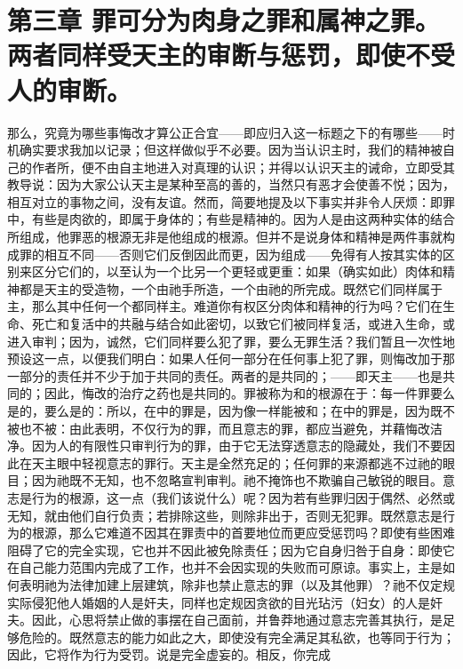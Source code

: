 
\section{第三章 罪可分为肉身之罪和属神之罪。两者同样受天主的审断与惩罚，即使不受人的审断。}

那么，究竟为哪些事悔改才算公正合宜——即应归入这一标题之下的有哪些——时机确实要求我加以记录；但这样做似乎不必要。因为当认识主时，我们的精神被自己的作者所，便不由自主地进入对真理的认识；并得以认识天主的诫命，立即受其教导说：因为大家公认天主是某种至高的善的，当然只有恶才会使善不悦；因为，相互对立的事物之间，没有友谊。然而，简要地提及以下事实并非令人厌烦：即罪中，有些是肉欲的，即属于身体的；有些是精神的。因为人是由这两种实体的结合所组成，他罪恶的根源无非是他组成的根源。但并不是说身体和精神是两件事就构成罪的相互不同——否则它们反倒因此而更，因为组成——免得有人按其实体的区别来区分它们的，以至认为一个比另一个更轻或更重：如果（确实如此）肉体和精神都是天主的受造物，一个由祂手所造，一个由祂的所完成。既然它们同样属于主，那么其中任何一个都同样主。难道你有权区分肉体和精神的行为吗？它们在生命、死亡和复活中的共融与结合如此密切，以致它们被同样复活，或进入生命，或进入审判；因为，诚然，它们同样要么犯了罪，要么无罪生活？我们暂且一次性地预设这一点，以便我们明白：如果人任何一部分在任何事上犯了罪，则悔改加于那一部分的责任并不少于加于共同的责任。两者的是共同的；——即天主——也是共同的；因此，悔改的治疗之药也是共同的。罪被称为和的根源在于：每一件罪要么是的，要么是的：所以，在中的罪是，因为像一样能被和；在中的罪是，因为既不被也不被：由此表明，不仅行为的罪，而且意志的罪，都应当避免，并藉悔改洁净。因为人的有限性只审判行为的罪，由于它无法穿透意志的隐藏处，我们不要因此在天主眼中轻视意志的罪行。天主是全然充足的；任何罪的来源都逃不过祂的眼目；因为祂既不无知，也不忽略宣判审判。祂不掩饰也不欺骗自己敏锐的眼目。意志是行为的根源，这一点（我们该说什么）呢？因为若有些罪归因于偶然、必然或无知，就由他们自行负责；若排除这些，则除非出于，否则无犯罪。既然意志是行为的根源，那么它难道不因其在罪责中的首要地位而更应受惩罚吗？即使有些困难阻碍了它的完全实现，它也并不因此被免除责任；因为它自身归咎于自身：即使它在自己能力范围内完成了工作，也并不会因实现的失败而可原谅。事实上，主是如何表明祂为法律加建上层建筑，除非也禁止意志的罪（以及其他罪）？祂不仅定规实际侵犯他人婚姻的人是奸夫，同样也定规因贪欲的目光玷污（妇女）的人是奸夫。因此，心思将禁止做的事摆在自己面前，并鲁莽地通过意志完善其执行，是足够危险的。既然意志的能力如此之大，即使没有完全满足其私欲，也等同于行为；因此，它将作为行为受罚。说是完全虚妄的。相反，你完成